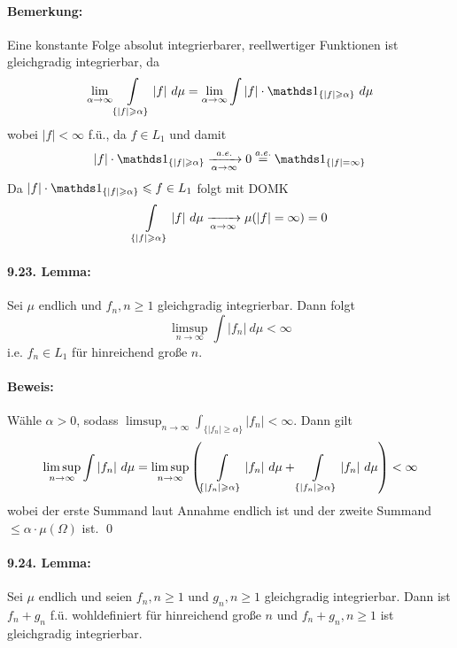 \documentclass[11pt]{report}
\begin{document}
\paragraph{Bemerkung:}Eine konstante Folge absolut integrierbarer, reellwertiger Funktionen ist gleichgradig integrierbar, da
$$\lim_{\alpha\to\infty}\int\displaylimits_{\{|f|\geq\alpha\}}|f|\ d\mu=\lim_{\alpha\to\infty}\int|f|\cdot\ind{\{|f|\geq\alpha\}}\ d\mu$$
wobei $|f|<\infty$ f.\"u., da $f\in L_1$ und damit 
$$|f|\cdot\ind{\{|f|\geq\alpha\}}\nto{a.e.}{\alpha\to\infty}0\overset{a.e.}{=}\ind{\{|f|=\infty\}}$$
Da $|f|\cdot\ind{\{|f|\geq\alpha\}}\leq f\in L_1$ folgt mit DOMK
$$\int\displaylimits_{\{|f|\geq\alpha\}}|f|\ d\mu\nto{}{\alpha\to\infty}\mu(|f|=\infty)=0$$

\paragraph{9.23. Lemma:}Sei $\mu$ endlich und $f_n,n\geq1$ gleichgradig integrierbar. Dann folgt
$$\limsup_{n\to\infty}\int|f_n|\ d\mu<\infty$$
i.e. $f_n\in L_1$ f\"ur hinreichend gro\ss{}e $n$.

\paragraph{Beweis:}W\"ahle $\alpha>0$, sodass $\limsup_{n\to\infty}\int_{\{|f_n|\geq\alpha\}}|f_n|<\infty$. Dann gilt
$$\limsup_{n\to\infty}\int|f_n|\ d\mu=\limsup_{n\to\infty}\left(\int\displaylimits_{\{|f_n|\geq\alpha\}}|f_n|\ d\mu+\int\displaylimits_{\{|f_n|\geq\alpha\}}|f_n|\ d\mu\right)<\infty$$
wobei der erste Summand laut Annahme endlich ist und der zweite Summand $\leq\alpha\cdot\mu(\Omega)$ ist. \qed

\paragraph{9.24. Lemma:}Sei $\mu$ endlich und seien $f_n,n\geq1$ und $g_n,n\geq1$ gleichgradig integrierbar. Dann ist $f_n+g_n$ f.\"u. wohldefiniert f\"ur hinreichend gro\ss{}e $n$ und $f_n+g_n,n\geq1$ ist gleichgradig integrierbar.
\end{document}
